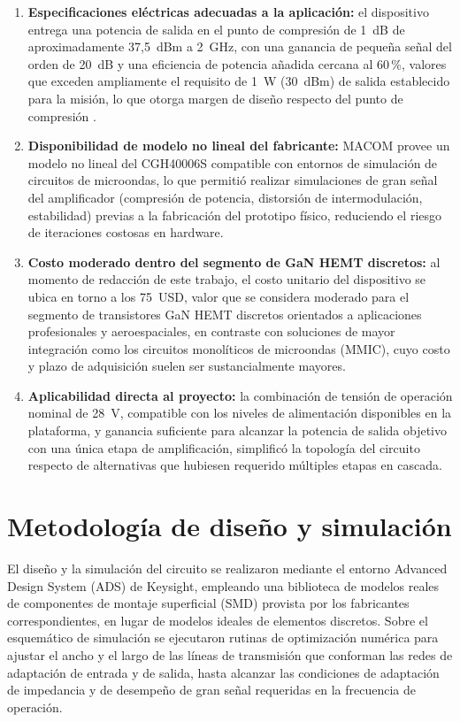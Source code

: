 \begin{enumerate}
    \item \textbf{Especificaciones eléctricas adecuadas a la aplicación:} el dispositivo entrega una potencia de salida en el punto de compresión de 1~dB de aproximadamente 37{,}5~dBm a 2~GHz, con una ganancia de pequeña señal del orden de 20~dB y una eficiencia de potencia añadida cercana al 60\,\%, valores que exceden ampliamente el requisito de 1~W (30~dBm) de salida establecido para la misión, lo que otorga margen de diseño respecto del punto de compresión \cite{macom}.

    \item \textbf{Disponibilidad de modelo no lineal del fabricante:} MACOM provee un modelo no lineal del CGH40006S compatible con entornos de simulación de circuitos de microondas, lo que permitió realizar simulaciones de gran señal del amplificador (compresión de potencia, distorsión de intermodulación, estabilidad) previas a la fabricación del prototipo físico, reduciendo el riesgo de iteraciones costosas en hardware.

    \item \textbf{Costo moderado dentro del segmento de GaN HEMT discretos:} al momento de redacción de este trabajo, el costo unitario del dispositivo se ubica en torno a los 75~USD, valor que se considera moderado para el segmento de transistores GaN HEMT discretos orientados a aplicaciones profesionales y aeroespaciales, en contraste con soluciones de mayor integración como los circuitos monolíticos de microondas (MMIC), cuyo costo y plazo de adquisición suelen ser sustancialmente mayores.

    \item \textbf{Aplicabilidad directa al proyecto:} la combinación de tensión de operación nominal de 28~V, compatible con los niveles de alimentación disponibles en la plataforma, y ganancia suficiente para alcanzar la potencia de salida objetivo con una única etapa de amplificación, simplificó la topología del circuito respecto de alternativas que hubiesen requerido múltiples etapas en cascada.
\end{enumerate}

\section{Metodología de diseño y simulación}
El diseño y la simulación del circuito se realizaron mediante el entorno Advanced Design System (ADS) de Keysight, empleando una biblioteca de modelos reales de componentes de montaje superficial (SMD) provista por los fabricantes correspondientes, en lugar de modelos ideales de elementos discretos. Sobre el esquemático de simulación se ejecutaron rutinas de optimización numérica para ajustar el ancho y el largo de las líneas de transmisión que conforman las redes de adaptación de entrada y de salida, hasta alcanzar las condiciones de adaptación de impedancia y de desempeño de gran señal requeridas en la frecuencia de operación.


